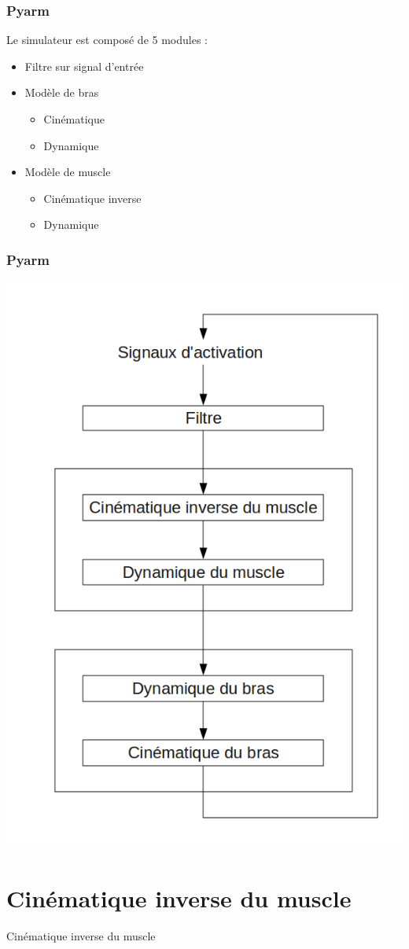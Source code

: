 \documentclass{beamer}
\begin{document}
\begin{frame}
\frametitle{Pyarm}
Le simulateur est composé de 5 modules :
\begin{itemize}
    \item Filtre sur signal d'entrée
    \item Modèle de bras
    \begin{itemize}
        \item Cinématique
        \item Dynamique
    \end{itemize}
    \item Modèle de muscle
    \begin{itemize}
        \item Cinématique inverse
        \item Dynamique
    \end{itemize}
\end{itemize}
\end{frame}

\begin{frame}
\frametitle{Pyarm}
\begin{center}
        \includegraphics[width=.40\linewidth]{fig/modules}
\end{center}
\end{frame}


\section{Cinématique inverse du muscle}
\begin{frame}
\begin{center}
{\LARGE Cinématique inverse du muscle}
\end{center}
\end{frame}
\end{document}
